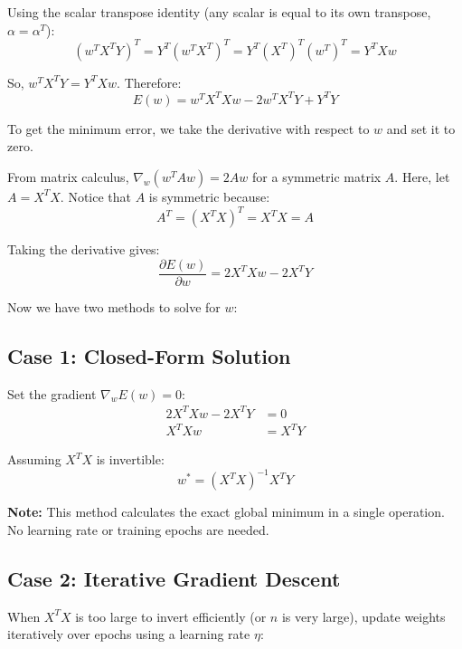 \documentclass[11pt,a4paper]{article}
\begin{document}
Using the scalar transpose identity (any scalar is equal to its own transpose, $\alpha = \alpha^T$):
\begin{equation*}
(w^T X^T Y)^T = Y^T (w^T X^T)^T = Y^T (X^T)^T (w^T)^T = Y^T X w
\end{equation*}

So, $w^T X^T Y = Y^T X w$. Therefore:
\begin{equation*}
E(w) = w^T X^T X w - 2 w^T X^T Y + Y^T Y
\end{equation*}

To get the minimum error, we take the derivative with respect to $w$ and set it to zero.

From matrix calculus, $\nabla_w (w^T A w) = 2 A w$ for a symmetric matrix $A$. Here, let $A = X^T X$. Notice that $A$ is symmetric because:
\begin{equation*}
A^T = (X^T X)^T = X^T X = A
\end{equation*}

Taking the derivative gives:
\begin{equation*}
\frac{\partial E(w)}{\partial w} = 2 X^T X w - 2 X^T Y
\end{equation*}

Now we have two methods to solve for $w$:

\subsection*{Case 1: Closed-Form Solution}

Set the gradient $\nabla_w E(w) = 0$:
\begin{align*}
2 X^T X w - 2 X^T Y &= 0 \\
X^T X w &= X^T Y
\end{align*}

Assuming $X^T X$ is invertible:
\begin{equation*}
w^* = (X^T X)^{-1} X^T Y
\end{equation*}

\textbf{Note:} This method calculates the exact global minimum in a single operation. No learning rate or training epochs are needed.

\subsection*{Case 2: Iterative Gradient Descent}

When $X^T X$ is too large to invert efficiently (or $n$ is very large), update weights iteratively over epochs using a learning rate $\eta$:
\end{document}
